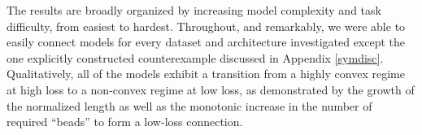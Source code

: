 The results are broadly organized by increasing model complexity and task difficulty, from easiest to hardest.  Throughout, and remarkably, we were able to easily connect models for every dataset and architecture investigated except the one explicitly constructed counterexample discussed in Appendix \ref{symdisc}.  Qualitatively, all of the models exhibit a transition from a highly convex regime at high loss to a non-convex regime at low loss, as demonstrated by the growth of the normalized length as well as the monotonic increase in the number of required ``beads'' to form a low-loss connection.


%	 



